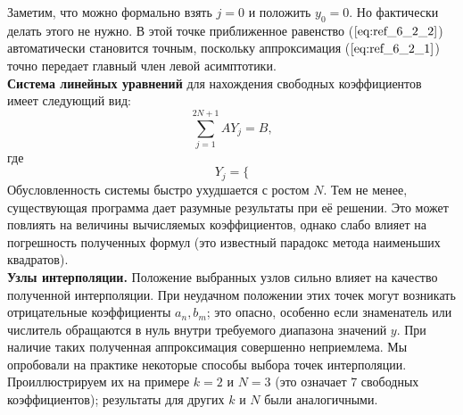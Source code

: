 Заметим, что можно формально взять $j=0$ и положить $y_0 = 0$. Но фактически делать этого
не нужно. В этой точке приближенное равенство ($\ref{eq:ref_6_2_2}$) автоматически становится точным, поскольку аппроксимация ($\ref{eq:ref_6_2_1}$) точно передает главный член левой асимптотики.
\\

\textbf{Система линейных уравнений} для нахождения свободных коэффициентов имеет следующий вид:
\begin{equation}
\sum\limits_{j=1}^{2N+1} AY_j = B,
\label{eq:ref_6_2_3}
\end{equation}
где
\begin{equation}
Y_j = \{ %
\label{eq:ref_6_2_4}
\end{equation}
Обусловленность системы быстро ухудшается с ростом $N$. Тем не менее,
существующая программа дает разумные результаты при её решении. Это может повлиять на величины вычисляемых коэффициентов, однако слабо влияет на погрешность полученных формул (это известный парадокс метода наименьших квадратов). 
\\

\textbf{Узлы интерполяции.} Положение выбранных узлов сильно влияет на качество полученной интерполяции.
При неудачном положении этих точек могут возникать отрицательные коэффициенты  $a_n, b_m$; это опасно, особенно если знаменатель или числитель обращаются в нуль внутри требуемого диапазона значений $y$.
При наличие таких полученная аппроксимация совершенно неприемлема.
Мы опробовали на практике некоторые способы выбора точек интерполяции. Проиллюстрируем их на примере $k = 2$ и $N = 3$ (это означает 7 свободных коэффициентов); результаты для других $k$ и $N$ были аналогичными.

